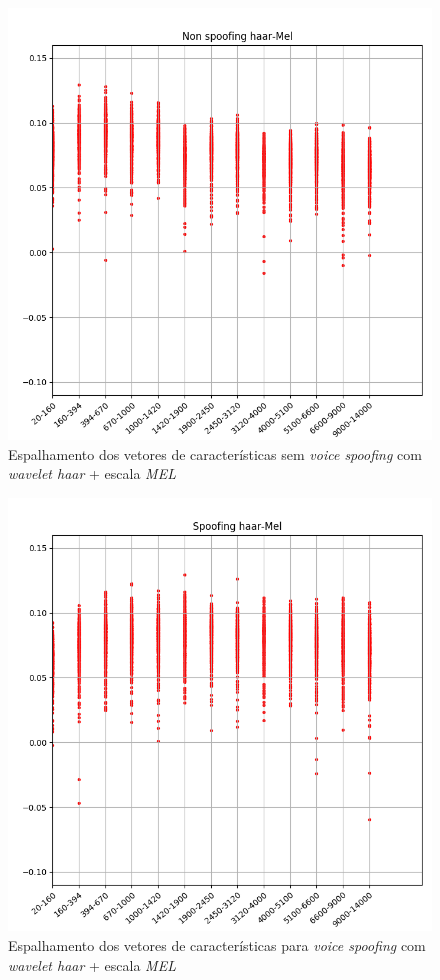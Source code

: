 		\begin{figure}
			\centering
			\includegraphics[width=\linewidth]{images/results/barkVersusMel/liveHaarMel}
			\caption{Espalhamento dos vetores de características sem \textit{voice spoofing} com \textit{wavelet haar} + escala \textit{MEL} }
			\label{fig:livehaarmel}
		\end{figure}
		\begin{figure}
			\centering
			\includegraphics[width=\linewidth]{images/results/barkVersusMel/spoofingHaarMel}
			\caption{Espalhamento dos vetores de características para \textit{voice spoofing} com \textit{wavelet haar} + escala \textit{MEL} }
			\label{fig:spoofinghaarmel}
		\end{figure}
